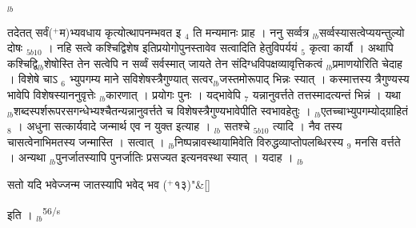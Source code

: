 \documentclass[article,12pt,a4paper]{memoir}%
\newcommand{\add}[1]{($^{+}$#1)}
\newcounter{parCount}
\begin{document}
	{}
	\pend%
      {\tiny $_{lb}$}

	  
	  \pstart \leavevmode%
	तदेतत् सर्वं\add{म}भ्यवधाय कृत्योत्थापनम्भवत इ {\tiny $_{4}$} ति मन्यमानः प्राह । {\color{DodgerBlue3}ननु सर्व्वत्र {\tiny $_{lb}$}सर्व्वस्यासत्वेप्ययन्तुल्यो दोषः} {\tiny $_{5b10}$} । नहि सत्वे कश्चिद्विशेष इतिप्रयोगोपुनस्तावेव सत्वादिति हेतुविपर्ययं {\tiny $_{5}$} कृत्वा कार्यौ । अथापि कश्चिद्वि{\tiny $_{lb}$}शेषोस्ति तेन सत्वेपि न सर्व्वं सर्वस्मात् जायते तेन संदिग्धविपक्षव्यावृत्तिकत्वं {\tiny $_{lb}$}प्रमाणयोरिति चेदाह । विशेषे चाऽ {\tiny $_{6}$} {\color{DodgerBlue3}भ्युपगम्य} माने सविशेषस्त्रैगुण्यात् सत्वर{\tiny $_{lb}$}जस्तमोरूपाद् भिन्नः स्यात् । कस्मात्तस्य त्रैगुण्यस्य भावेपि विशेषस्याननुवृत्तेः {\tiny $_{lb}$}कारणात् । प्रयोगः पुनः । यद्भावेपि {\tiny $_{7}$} यन्नानुवर्त्तते तत्तस्मादत्यन्तं भिन्नं । यथा {\tiny $_{lb}$}शब्दस्पर्शरूपरसगन्धेभ्यश्चैतन्यन्नानुवर्त्तते च विशेषस्त्रैगुण्यभावेपीति स्वभावहेतुः । {\tiny $_{lb}$}एतच्चाभ्युपगम्योद्ग्राहितं {\tiny $_{8}$} । अधुना सत्कार्यवादे जन्मार्थ एव न युक्त इत्याह । {\tiny $_{lb}$} {\color{DodgerBlue3}सतश्चे} {\tiny $_{5b10}$} त्यादि । नैव तस्य चासत्वेनाभिमतस्य जन्मास्ति । सत्वात् । {\tiny $_{lb}$}निष्पन्नावस्थायामिवेति विरुद्धव्याप्तोपलब्धिरस्य {\tiny $_{9}$} \leavevmode{} मनसि वर्त्तते । अन्यथा {\tiny $_{lb}$}पुनर्जातस्यापि पुनर्जातिः प्रसज्यत इत्यनवस्था स्यात् । यदाह । {\tiny $_{lb}$} 
	    \pend%
	  
	    
	    \stanza[\smallbreak]
	  सतो यदि भवेज्जन्म जातस्यापि भवेद् भव \add{१३}{\normalfontlatin\large\qquad{}"}\&[\smallbreak]
	  
	  
	  
	    \pstart  \leavevmode%
	    \hphantom{.}
	   इति ।
	{}
	\pend%
      {\tiny $_{lb}$}\textsuperscript{\textenglish{56/s}}
\end{document}
